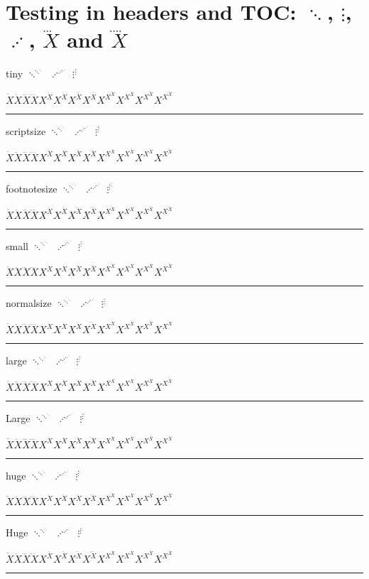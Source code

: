 \documentclass{article}
\newcommand\testdots{%
$\ddots^{\ddots^{\ddots}}$ $\iddots^{\iddots^{\iddots}}$
$\vdots^{\vdots^{\vdots}}$
\par
$\dot{X}
\ddot{X}
\dddot{X}
\ddddot{X}
X^{\dot{X}}
X^{\ddot{X}}
X^{\dddot{X}}
X^{\ddddot{X}}
X^{X^{\dot{X}}}
X^{X^{\ddot{X}}}
X^{X^{\dddot{X}}}
X^{X^{\ddddot{X}}}$
\par\smallskip\hrule\smallskip}
\begin{document}
\pagestyle{headings}
\tableofcontents
\clearpage

\section{Testing in headers and TOC:
    $\ddots$, $\vdots$, $\iddots$, $\dddot{X}$ and $\ddddot{X}$}

\tiny tiny \testdots
\scriptsize scriptsize \testdots
\footnotesize footnotesize \testdots
\small small \testdots
\normalsize normalsize \testdots
\large large \testdots
\Large Large \testdots
\huge huge \testdots
\Huge Huge \testdots
\end{document}
